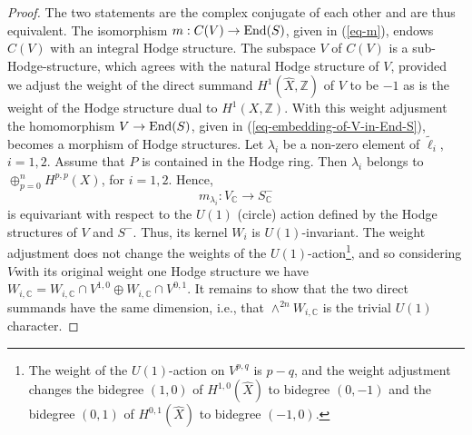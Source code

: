 \documentclass[12pt]{amsart}
\numberwithin{equation}{subsection}
\theoremstyle{plain}
\theoremstyle{definition}
\newcommand{\CC}{{\mathbb C}}
\newcommand{\ZZ}{{\mathbb Z}}
\newcommand{\End}{{\rm End}}
\begin{document}
\begin{proof}
The two statements are the complex conjugate of each other  and are thus equivalent.
The isomorphism $m:C(V)\rightarrow \End(S)$, given in (\ref{eq-m}),  endows $C(V)$ with an integral Hodge structure. 
The subspace $V$ of $C(V)$  is a sub-Hodge-structure, which agrees with
the natural Hodge structure of $V$, provided we adjust the weight of the direct summand $H^1(\hat{X},\ZZ)$ of $V$ to be $-1$ as is the weight of the Hodge structure dual to $H^1(X,\ZZ)$. With this weight adjusment the homomorphism $V\rightarrow \End(S)$, given in 
(\ref{eq-embedding-of-V-in-End-S}), becomes a morphism of Hodge structures. 
Let $\lambda_i$ be a non-zero element of $\tilde{\ell}_i$, $i=1,2$.
Assume that $P$ is contained in the Hodge ring. Then $\lambda_i$ belongs to $\oplus_{p=0}^n H^{p,p}(X)$, for $i=1,2$. Hence, 
\[
m_{\lambda_i}:V_\CC\rightarrow S^-_\CC
\]
is  equivariant with respect to the $U(1)$ (circle) action defined by the Hodge structures of $V$ and $S^-$. Thus, its kernel $W_i$ is $U(1)$-invariant.
The weight adjustment does not change the weights of the $U(1)$-action\footnote{The weight of the $U(1)$-action on $V^{p,q}$ is $p-q$, and the weight adjustment changes the bidegree $(1,0)$ of $H^{1,0}(\hat{X})$ to bidegree $(0,-1)$ and the bidegree $(0,1)$ of $H^{0,1}(\hat{X})$ to bidegree $(-1,0)$.}, and so considering $V$with its original weight one Hodge structure we have
$W_{i,\CC}=W_{i,\CC}\cap V^{1,0}\oplus W_{i,\CC}\cap V^{0,1}$. 
It remains to show that the two direct summands have the same dimension, i.e., that $\wedge^{2n} W_{i,\CC}$ is the trivial $U(1)$ character. 


\end{proof}
\end{document}

